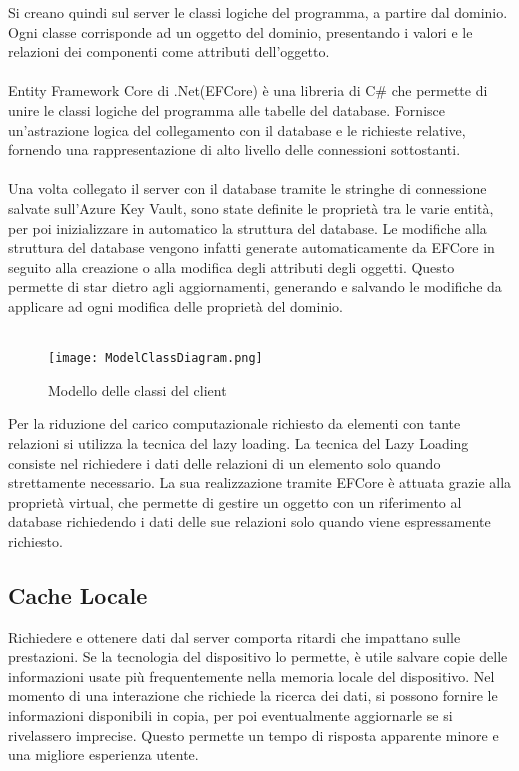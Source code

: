 Si creano quindi sul server le classi logiche del programma, a partire dal dominio. 
Ogni classe corrisponde ad un oggetto del dominio, presentando i valori e le relazioni dei componenti come attributi dell’oggetto.\\
\\
Entity Framework Core di .Net(EFCore) è una libreria di C\# che permette di unire le classi logiche del programma alle tabelle del database. 
Fornisce un’astrazione logica del collegamento con il database e le richieste relative, fornendo una rappresentazione di alto livello delle connessioni sottostanti. \\
\\
Una volta collegato il server con il database tramite le stringhe di connessione salvate sull’Azure Key Vault, 
sono state definite le proprietà tra le varie entità, per poi inizializzare in automatico la struttura del database. 
Le modifiche alla struttura del database vengono infatti generate automaticamente da EFCore in seguito alla creazione o alla modifica degli attributi degli oggetti. 
Questo permette di star dietro agli aggiornamenti, generando e salvando le modifiche da applicare ad ogni modifica delle proprietà del dominio.\\
\\
\begin{figure}[h!]
    \begin{center}
        \texttt{[image: ModelClassDiagram.png]}
        \caption{Modello delle classi del client}
    \end{center}
\end{figure}

Per la riduzione del carico computazionale richiesto da elementi con tante relazioni si utilizza la tecnica del lazy loading. 
La tecnica del Lazy Loading consiste nel richiedere i dati delle relazioni di un elemento solo quando strettamente necessario. 
La sua realizzazione tramite EFCore è attuata grazie alla proprietà virtual, 
che permette di gestire un oggetto con un riferimento al database richiedendo i dati delle sue relazioni solo quando viene espressamente richiesto.
\clearpage
\subsection{ Cache Locale}

Richiedere e ottenere dati dal server comporta ritardi che impattano sulle prestazioni. 
Se la tecnologia del dispositivo lo permette, è utile salvare copie delle informazioni usate più frequentemente nella memoria locale del dispositivo. 
Nel momento di una interazione che richiede la ricerca dei dati, si possono fornire le informazioni disponibili in copia, 
per poi eventualmente aggiornarle se si rivelassero imprecise. Questo permette un tempo di risposta apparente minore e una migliore esperienza utente.\\
\\
